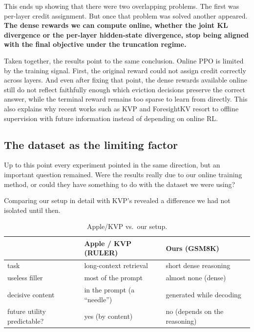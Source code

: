 This ends up showing that there were two overlapping problems. The first was per-layer credit assignment. But once that problem was solved another appeared. \textbf{The dense rewards we can compute online, whether the joint KL divergence or the per-layer hidden-state divergence, stop being aligned with the final objective under the truncation regime.}

Taken together, the results point to the same conclusion. Online PPO is limited by the training signal. First, the original reward could not assign credit correctly across layers. And even after fixing that point, the dense rewards available online still do not reflect faithfully enough which eviction decisions preserve the correct answer, while the terminal reward remains too sparse to learn from directly.
This also explains why recent works such as KVP and ForesightKV resort to offline supervision with future information instead of depending on online RL.


\subsection{The dataset as the limiting factor} \label{subsec: dataset}

Up to this point every experiment pointed in the same direction, but an important question remained. Were the results really due to our online training method, or could they have something to do with the dataset we were using?

Comparing our setup in detail with KVP's revealed a difference we had not isolated until then.

\begin{table}[H]
\centering
\caption{Apple/KVP vs.\ our setup.}
\begin{tabular}[t]{lll}
\toprule
 & \textbf{Apple / KVP (RULER)} & \textbf{Ours (GSM8K)}\\
\midrule
task & long-context retrieval & short dense reasoning\\
useless filler & most of the prompt & almost none (dense)\\
decisive content & in the prompt (a ``needle'') & generated while decoding\\
future utility predictable? & yes (by content) & no (depends on the reasoning)\\
\bottomrule
\end{tabular}
\label{tab: apple_vs_ours}
\end{table}

